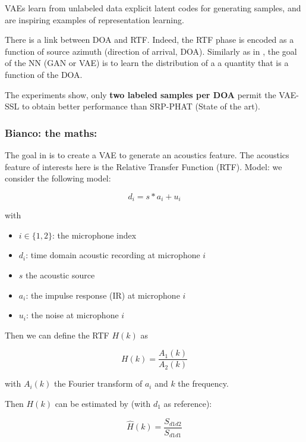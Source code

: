 \documentclass{article}
\begin{document}
VAEs learn from unlabeled data explicit latent codes for generating samples, and are
inspiring examples of representation learning. 

There is a link between DOA and RTF. Indeed, the RTF phase is encoded as a function of source azimuth (direction of arrival, DOA). Similarly as in \cite{gerstoft2020parametric}, the goal of the NN (GAN or VAE) is to learn the distribution of a a quantity that is a function of the DOA. 

The experiments show, only \textbf{two labeled samples per DOA} permit the VAE-SSL to obtain better performance than SRP-PHAT (State of the art).

\subsubsection{Bianco: the maths:}

The goal in  \cite{bianco2020semi} is to create a VAE to generate an acoustics feature. The acoustics feature of interests here is the Relative Transfer Function (RTF). Model: we consider the following model:

\begin{equation}
    d_i = s \ast a_i + u_i 
\end{equation}

with \begin{itemize}
    \item $i \in \{1,2\}$: the microphone index
    \item $d_i$: time domain acoustic recording at microphone $i$
    \item $s$ the acoustic source
    \item $a_i$: the impulse response (IR) at microphone $i$  
    \item $u_i$: the noise at microphone $i$ 
\end{itemize}

Then we can define the RTF $H(k)$ as

\begin{equation}
    H(k) = \frac{A_1(k)}{A_2(k)}
\end{equation}

with $A_i(k)$ the Fourier transform of $a_i$ and $k$ the frequency.

Then $H(k)$ can be estimated by (with $d_1$ as reference):

\begin{equation}
        \hat{H}(k) = \frac{S_{d1d2}}{S_{d1d1}}
\end{equation}
\end{document}
